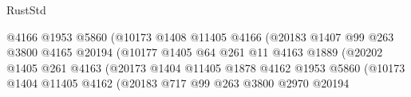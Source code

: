 \begin{lexlean}{RustStd}
\begin{coremodule}
                                                @4166
                                                @1953
                                                @5860
                                                (@10173
                                                  @1408
                                                  @11405
                                                  @4166
                                                  (@20183
                                                    @1407
                                                    @99
                                                    @263
                                                    @3800
                                                    @4165
                                                    @20194
                                                    (@10177
                                                      @1405
                                                      @64
                                                      @261
                                                      @11
                                                      @4163
                                                      @1889
                                                      (@20202
                                                        @1405
                                                        @261
                                                        @4163
                                                        (@20173
                                                          @1404
                                                          @11405
                                                          @1878
                                                          @4162
                                                          @1953
                                                          @5860
                                                          (@10173
                                                            @1404
                                                            @11405
                                                            @4162
                                                            (@20183
                                                              @717
                                                              @99
                                                              @263
                                                              @3800
                                                              @2970
                                                              @20194

\end{coremodule}
\end{lexlean}
